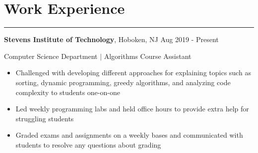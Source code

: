 \documentclass[10pt]{article}
\newcommand{\resumesection}[1]{\vspace{-0.2cm}\section*{#1}\vspace{-0.2cm}\hrule\vspace{0.2cm}}
\begin{document}


\resumesection{Work Experience}

\textbf{Stevens Institute of Technology}, Hoboken, NJ \hfill Aug 2019 - Present\par
Computer Science Department $\vert$ Algorithms Course Assistant %
\begin{itemize}
	\item Challenged with developing different approaches for explaining topics such as sorting, dynamic programming, greedy algorithms, and analyzing code complexity to students one-on-one
	\item Led weekly programming labs and held office hours to provide extra help for struggling students
	\item Graded exams and assignments on a weekly bases and communicated with students to resolve any questions about grading
\end{itemize}
\end{document}
